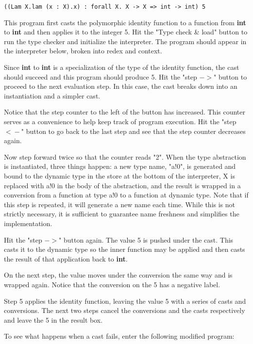 \documentclass[11pt,numbers,nocopyrightspace,acmlarge,anonymous]{acmart}
\begin{document}
\begin{lstlisting}
((Lam X.lam (x : X).x) : forall X. X -> X => int -> int) 5
\end{lstlisting}

This program first casts the polymorphic identity function to a
function from \textbf{int} to \textbf{int} and then applies it to
the integer 5. Hit the "Type check \& load" button to run the type checker
and initialize the interpreter. The program should appear in the
interpreter below, broken into redex and context.

Since \textbf{int} to \textbf{int} is a specialization
of the type of the identity function, the cast should succeed and
this program should produce 5. Hit the "step $-\!\!>$" button to 
proceed to the next evaluation step. In this case, the cast breaks
down into an instantiation and a simpler cast.

Notice that the step counter to the left of the button has increased.
This counter serves as a convenience to help keep track of program execution.
Hit the "step $<\!\!-$" button to go back to the last step and see that 
the step counter decreases again.

Now step forward twice so that the counter reads "2". When the 
type abstraction is instantiated, three things happen: a new type name,
"a!0", is generated and bound to the dynamic type in the store 
at the bottom of the interpreter,
X is replaced with a!0 in the body of the abstraction, 
and the result is wrapped in a conversion from a function at type a!0 
to a function at dynamic type. Note that if this step is repeated,
it will generate a new name each time. While this is not strictly
necessary, it is sufficient to guarantee name freshness and simplifies
the implementation.

Hit the "step $-\!\!>$" button again. The value 5 is pushed under the
cast. This casts it to the dynamic type so the inner function may be applied
and then casts the result of that application back to \textbf{int}.

On the next step, the value moves under the conversion the same way
and is wrapped again. Notice that the conversion on the 5 has a negative
label. 

Step 5 applies the identity function, leaving the value 5 with
a series of casts and conversions. The next two steps cancel the 
conversions and the casts respectively and leave the 5 in the result box.

To see what happens when a cast fails, enter the following modified program:
\end{document}

